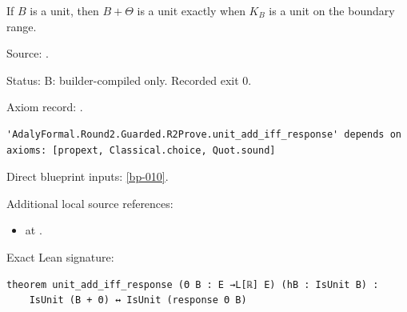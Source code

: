 \begin{theorem}[bp-015]
\label{bp-015}
\leanok
If \(B\) is a unit, then \(B+\Theta\) is a unit exactly when \(K_B\) is a unit on the boundary range.

\par Source: \texttt{}.
\par Status: B: builder-compiled only. Recorded exit 0.
\par Axiom record: \texttt{}.
\begin{verbatim}
'AdalyFormal.Round2.Guarded.R2Prove.unit_add_iff_response' depends on axioms: [propext, Classical.choice, Quot.sound]
\end{verbatim}
\par Direct blueprint inputs: \ref{bp-010}.
\par Additional local source references:
\begin{itemize}
\item \texttt{} at \texttt{}.
\end{itemize}
\par Exact Lean signature:
\begin{verbatim}
theorem unit_add_iff_response (Θ B : E →L[ℝ] E) (hB : IsUnit B) :
    IsUnit (B + Θ) ↔ IsUnit (response Θ B)
\end{verbatim}
\end{theorem}

